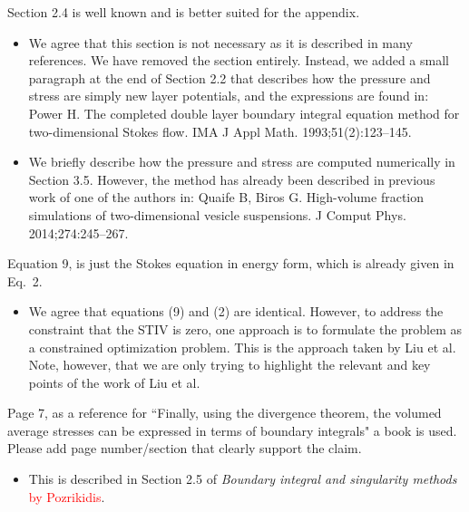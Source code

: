 \documentclass[11pt]{article}
\newcommand{\comment}[1]{{\color{blue} #1}}
\begin{document}
\noindent
\comment{Section 2.4 is well known and is better suited for the
appendix.}
\begin{itemize}
  \item We agree that this section is not necessary as it is described
    in many references.  We have removed the section entirely.  Instead,
    we added a small paragraph at the end of Section 2.2 that describes
    how the pressure and stress are simply new layer potentials, and the
    expressions are found in: \newline
    Power H. The completed double layer boundary integral equation
    method for two-dimensional Stokes flow.  IMA J Appl Math.
    1993;51(2):123--145.

  \item We briefly  describe how the pressure and stress are computed
    numerically in Section 3.5.  However, the method has already been
    described in previous work of one of the authors in: \newline
    Quaife B, Biros G. High-volume fraction simulations of
    two-dimensional vesicle suspensions. J Comput Phys.
    2014;274:245--267.
\end{itemize}


\noindent
\comment{Equation 9, is just the Stokes equation in energy form, which
is already given in Eq.~2.}
\begin{itemize}
  \item We agree that equations (9) and (2) are identical.  However, to
    address the constraint that the STIV is zero, one approach is to
    formulate the problem as a constrained optimization problem.  This
    is the approach taken by Liu et al.  Note, however, that we are only
    trying to highlight the relevant and key points of the work of Liu
    et al.
\end{itemize}

\noindent
\comment{Page 7, as a reference for ``Finally, using the divergence
theorem, the volumed average stresses can be expressed in terms of
boundary integrals" a book is used.  Please add page number/section that
clearly support the claim.}
\begin{itemize}
  \item This is described in Section 2.5 of {\em Boundary
    integral and singularity methods} \textcolor{red}{by Pozrikidis}.
\end{itemize}
\end{document}
